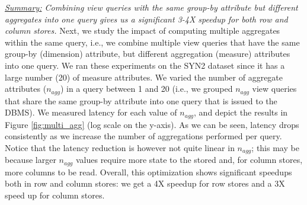 

{\em \underline{Summary:} Combining view queries with the same group-by attribute
but different aggregates into one query gives us a significant 
3-4X speedup for both row and column stores.}
Next, we study the impact of computing multiple aggregates within the same query,
i.e., we combine multiple view queries that have the same group-by (dimension) 
attribute, but different aggregation (measure) attributes into one query.
We ran these experiments on the SYN2 dataset 
since it has a large number (20) of measure attributes.
We varied the number of aggregate attributes ($n_{agg}$)
in a query between 1 and 20 (i.e., we grouped $n_{agg}$ view
queries that share the same group-by attribute into one query
that is issued to the DBMS).
We measured latency for each value of $n_{agg}$,
and depict the results in Figure \ref{fig:multi_agg} (log scale on the y-axis).
As we can be seen, latency drops consistently as we increase the
number of aggregations performed per query.
Notice that the latency reduction is however not quite linear in $n_{agg}$;
this may be because larger
$n_{agg}$ values require more state to the stored and, 
for column stores, more columns to be read.
Overall, this optimization shows significant speedups both in row and column stores: we
get a 4X speedup for row stores and a 3X speed up for column stores.



